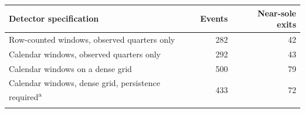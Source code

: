 \begin{tabular}{@{}lrr@{}}
\toprule
Detector specification & Events & Near-sole exits \\
\midrule
Row-counted windows, observed quarters only & 282 & 42 \\
Calendar windows, observed quarters only & 292 & 43 \\
Calendar windows on a dense grid & 500 & 79 \\
Calendar windows, dense grid, persistence required\textsuperscript{a} & 433 & 72 \\
\botrule
\end{tabular}
